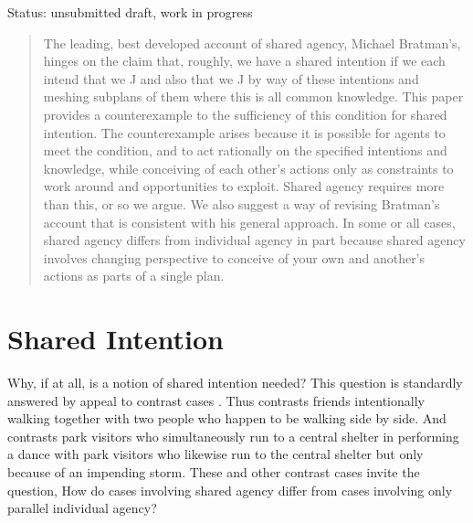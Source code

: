 \documentclass[12pt,\papersize]{extarticle}
\begin{document}
\setlength\footnotesep{1em}


\maketitle

\begin{center}
Status: unsubmitted draft, work in progress
\end{center}

\begin{abstract}
\noindent
The leading, best developed account of shared agency, Michael Bratman's, hinges on the claim that, roughly,
we have a shared intention if we each intend that we J and also that we J by way of these intentions and meshing subplans of them where this is all common knowledge.
This paper provides a counterexample to the sufficiency of this condition for shared intention.
The counterexample arises because it is possible for agents to meet the condition, and to act rationally on the specified  intentions and knowledge,
 while conceiving of each other's actions only as constraints to work around and opportunities to exploit.
Shared agency requires more than this, or so we argue.
We also suggest a way of revising Bratman's account  that is consistent with his general approach.
In some or all cases, shared agency differs from individual agency in part because shared agency involves 
changing perspective 
to conceive of your own and another's actions  as parts of a single plan.

\end{abstract}

\section{Shared Intention}
Why, if at all, is a notion of shared intention needed? 
This question is standardly answered by appeal to contrast cases \citep[compare][p.\ 150]{Bratman:2009lv}.
Thus \citet{gilbert_walking_1990} contrasts friends intentionally walking together with two people who happen to be walking side by side. 
And \citet{Searle:1990em} contrasts park visitors who  simultaneously run to a central shelter in performing a dance with park visitors who likewise run to the central shelter but only because of an impending storm.
These and other contrast cases invite the question, 
How do cases involving shared agency differ from cases involving only  parallel individual agency? 
\end{document}
